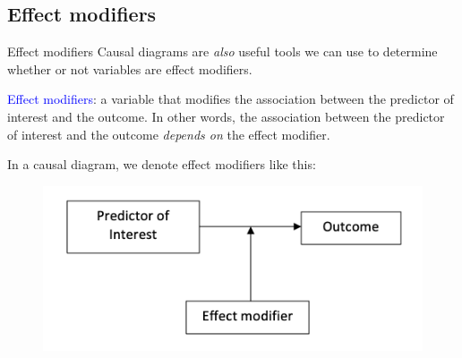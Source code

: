 \documentclass[10pt,t]{beamer}
\begin{document}
\subsection{Effect modifiers}

\begin{frame}{Effect modifiers}
Causal diagrams are \textit{also} useful tools we can use to determine whether or not variables are effect modifiers.

\vspace{0.3cm}

\textcolor{blue}{Effect modifiers}: a variable that modifies the association between the predictor of interest and the outcome. In other words, the association between the predictor of interest and the outcome \textit{depends on} the effect modifier. \pause

\vspace{0.3cm}

In a causal diagram, we denote effect modifiers like this:

\vspace{0.1cm}

\begin{figure}
	\centering \includegraphics[scale=0.4]{effectmod1.png}
\end{figure}
\end{frame}
\end{document}
